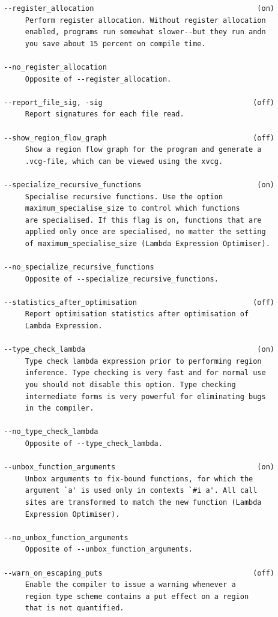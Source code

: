 \documentclass[12pt]{book}
\begin{document}
\begin{verbatim}
--register_allocation                                      (on)
     Perform register allocation. Without register allocation
     enabled, programs run somewhat slower--but they run andn
     you save about 15 percent on compile time.

--no_register_allocation
     Opposite of --register_allocation.

--report_file_sig, -sig                                   (off)
     Report signatures for each file read.

--show_region_flow_graph                                  (off)
     Show a region flow graph for the program and generate a
     .vcg-file, which can be viewed using the xvcg.

--specialize_recursive_functions                           (on)
     Specialise recursive functions. Use the option
     maximum_specialise_size to control which functions
     are specialised. If this flag is on, functions that are
     applied only once are specialised, no matter the setting
     of maximum_specialise_size (Lambda Expression Optimiser).

--no_specialize_recursive_functions
     Opposite of --specialize_recursive_functions.

--statistics_after_optimisation                           (off)
     Report optimisation statistics after optimisation of
     Lambda Expression.

--type_check_lambda                                        (on)
     Type check lambda expression prior to performing region
     inference. Type checking is very fast and for normal use
     you should not disable this option. Type checking
     intermediate forms is very powerful for eliminating bugs
     in the compiler.

--no_type_check_lambda
     Opposite of --type_check_lambda.

--unbox_function_arguments                                 (on)
     Unbox arguments to fix-bound functions, for which the
     argument `a' is used only in contexts `#i a'. All call 
     sites are transformed to match the new function (Lambda
     Expression Optimiser).

--no_unbox_function_arguments
     Opposite of --unbox_function_arguments.

--warn_on_escaping_puts                                   (off)
     Enable the compiler to issue a warning whenever a 
     region type scheme contains a put effect on a region
     that is not quantified.
\end{verbatim}
\end{document}
